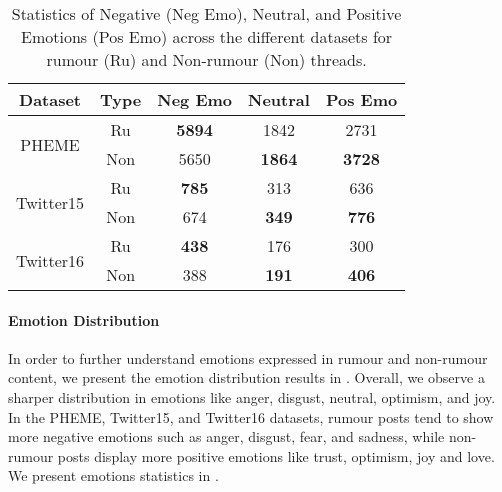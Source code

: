 \begin{table}[t]
\centering
\small
\begin{tabular}{ccccc}
\toprule
\textbf{Dataset} & \textbf{Type} & \textbf{Neg Emo} & \textbf{Neutral} & \textbf{Pos Emo} \\ 
\toprule
\multirow{2}{*}{PHEME}  
        & Ru  & \textbf{5894} & 1842 & 2731 \\
        & Non & 5650 & \textbf{1864} & \textbf{3728} \\ 
\multirow{2}{*}{Twitter15} 
        & Ru  & \textbf{785}  & 313  & 636 \\
        & Non & 674  & \textbf{349}  & \textbf{776} \\ 

\multirow{2}{*}{Twitter16} 
        & Ru  & \textbf{438}  & 176  & 300 \\
        & Non & 388  & \textbf{191}  & \textbf{406} \\ 

\bottomrule
\end{tabular}
\caption{Statistics of Negative (Neg Emo), Neutral, and Positive Emotions (Pos Emo) across the different datasets for rumour (Ru) and Non-rumour (Non) threads.}
\label{tab:emo_stats}
\end{table}


\paragraph{Emotion Distribution}
In order to further understand emotions expressed in rumour and non-rumour content, we present the emotion distribution results in . Overall, we observe a sharper distribution in emotions like anger, disgust, neutral, optimism, and joy. In the PHEME, Twitter15, and Twitter16 datasets, rumour posts tend to show more negative emotions such as anger, disgust, fear, and sadness, while non-rumour posts display more positive emotions like trust, optimism, joy and love. We present emotions statistics in .




